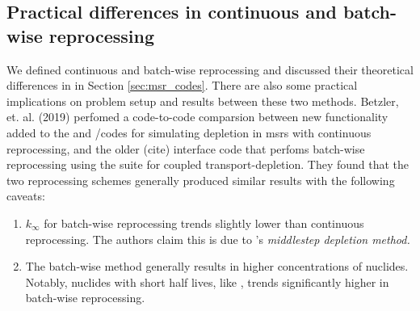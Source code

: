 \subsection{Practical differences in continuous and batch-wise reprocessing}
We defined continuous and batch-wise reprocessing and discussed their
theoretical differences in in Section \ref{sec:msr_codes}. There are also some
practical implications on problem setup and results between these two methods.
Betzler, et. al. (2019) \cite{betzler_molten_2019} perfomed a code-to-code
comparsion between new functionality added to the \ORIGEN and \SCALE/\TRITON codes
for simulating depletion in \Gls{msr}s with continuous reprocessing, and the
older \ChemTriton(cite) interface code that perfoms batch-wise reprocessing using
the \SCALE suite for coupled transport-depletion. They found that the two
reprocessing schemes generally produced similar results with the following
caveats:
\begin{enumerate}
    \item $k_{\infty}$ for batch-wise reprocessing trends slightly lower than  continuous reprocessing. The authors claim this is due to \ChemTriton's \it{middlestep depletion method}. 
    \item The batch-wise method generally results in higher concentrations of nuclides. Notably, nuclides with short half lives, like , trends significantly higher in batch-wise reprocessing.
\end{enumerate}


